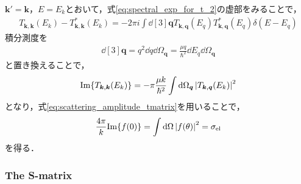 \documentclass[a4paper,11pt]{ltjsarticle}
\begin{document}
$\bm{k}' = \bm{k}$，$E = E_k$とおいて，式\ref{eq:spectral_exp_for_t_2}の虚部をみることで，
\begin{align}\label{eq:imaginary_part_of_T}
  T_{\bm{k}, \bm{k}}(E_k) - T_{\bm{k}, \bm{k}}^*(E_k) = -2\pi i \int \dd[3]{\bm{q}}T_{\bm{k}, \bm{q}}(E_q) T_{\bm{k}, \bm{q}}^*(E_q)\delta(E-E_q)
\end{align}
積分測度を
\begin{align*}
  \dd[3]{\bm{q}} = q^2 \dd{q} \dd{\Omega_{\bm{q}}} = \frac{\mu q}{\hbar^2} \dd{E_q} \dd{\Omega_{\bm{q}}}
\end{align*}
と置き換えることで，
\begin{align}\label{eq:imaginary_part_of_t_2}
  \mathrm{Im} \qty{T_{\bm{k}, \bm{k}}(E_k)} = - \pi \frac{\mu k}{\hbar^2} \int \dd{\Omega_{\bm{q}}} \abs{T_{\bm{k},\bm{q}}(E_k)}^2
\end{align}
となり，式\ref{eq:scattering_amplitude_tmatrix}を用いることで，
\begin{align}\label{eq:optical_theorem}
  \frac{4\pi}{k}\mathrm{Im}\qty{f(0)} = \int \dd{\Omega} \abs{f(\theta)}^2 = \sigma_\text{el}
\end{align}
を得る．
\subsubsection{The S-matrix}












\newpage
% 
% 
\printbibliography%
\end{document}

